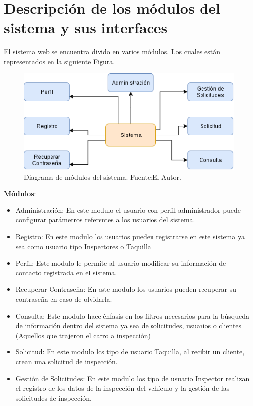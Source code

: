 \section{Descripción de los módulos del sistema y sus interfaces } 
\setlength{\parskip}{5mm}
El sistema web se encuentra divido en varios módulos. Los cuales están representados en la siguiente Figura.
\setlength{\parskip}{0mm}
\begin{figure}[H]
\begin{center}
	\includegraphics[width=\textwidth]{img/modulos_del_sistema.png}
\end{center}
\caption{Diagrama de módulos del sistema. Fuente:El Autor.}
\label{fig:Modulos_del_sistema}
\end{figure}


\textbf{Módulos}:
\begin{itemize}
	\item Administración: En este modulo el usuario con perfil administrador puede configurar parámetros referentes a los usuarios del sistema.
	
	\item Registro: En este modulo los usuarios pueden registrarse en este sistema ya sea como usuario tipo Inspectores o Taquilla.
	
	\item Perfil: Este modulo le permite al usuario modificar su información de contacto registrada en el sistema.
	
	\item Recuperar Contraseña: En este modulo los usuarios pueden recuperar su contraseña en caso de olvidarla. 
	
	\item Consulta: Este modulo hace énfasis en los filtros necesarios para la búsqueda de información dentro del sistema ya sea de solicitudes, usuarios o clientes (Aquellos que trajeron el carro a inspección)
	
	\item Solicitud: En este modulo los tipo de usuario Taquilla, al recibir un cliente, crean una solicitud de inspección.
	
	\item Gestión de Solicitudes: En este modulo los tipo de usuario Inspector realizan el registro de los datos de la inspección del vehículo y la gestión de las solicitudes de inspección.
	

\end{itemize}

